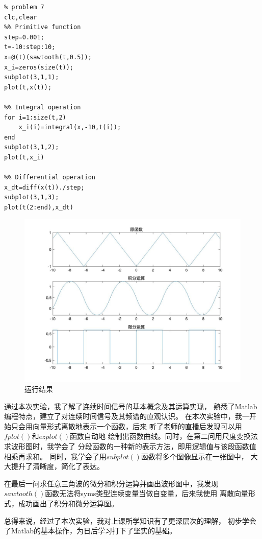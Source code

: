 \documentclass[a4paper,12pt]{ctexart}
\begin{document}
\begin{lstlisting}
% problem 7
clc,clear
%% Primitive function
step=0.001;
t=-10:step:10;
x=@(t)(sawtooth(t,0.5));
x_i=zeros(size(t));
subplot(3,1,1);
plot(t,x(t));

%% Integral operation
for i=1:size(t,2)
    x_i(i)=integral(x,-10,t(i));
end
subplot(3,1,2);
plot(t,x_i)

%% Differential operation
x_dt=diff(x(t))./step;
subplot(3,1,3);
plot(t(2:end),x_dt)
\end{lstlisting}

\begin{figure}[H]
    \centering
    \includegraphics[width=14cm]{7_new.jpg}
    \caption{运行结果}
\end{figure}

\par
通过本次实验，我了解了连续时间信号的基本概念及其运算实现，
熟悉了Matlab编程特点，建立了对连续时间信号及其频谱的直观认识。
在本次实验中，我一开始只会用向量形式离散地表示一个函数，后来
听了老师的直播后发现可以用$fplot()$和$ezplot()$函数自动地
绘制出函数曲线。同时，在第二问用尺度变换法求波形图时，我学会了
分段函数的一种新的表示方法，即用逻辑值与该段函数值相乘再求和。
同时，我学会了用$subplot()$函数将多个图像显示在一张图中，
大大提升了清晰度，简化了表达。
\par
在最后一问求任意三角波的微分和积分运算并画出波形图中，我发现
$sawtooth()$函数无法将syms类型连续变量当做自变量，后来我使用
离散向量形式，成功画出了积分和微分运算图。
\par
总得来说，经过了本次实验，我对上课所学知识有了更深层次的理解，
初步学会了Matlab的基本操作，为日后学习打下了坚实的基础。
\end{document}
